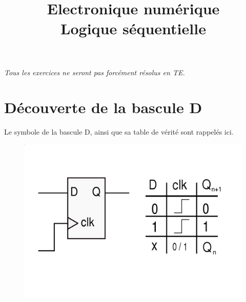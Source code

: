 \documentclass[a4paper,11pt]{article}
\title{{\Huge Electronique numérique}\\Logique séquentielle}
\date{}
\begin{document}
\maketitle

{\it Tous les exercices ne seront pas forcément résolus en TE.}



\section{Découverte de la bascule D}
Le symbole de la bascule D, ainsi que sa table de vérité sont rappelés ici.\\

\begin{figure}[!h]
\begin{center}
\includegraphics[scale=0.2]{./figures/d-ff-infos.jpg}
\end{center}
\end{figure}
\end{document}

